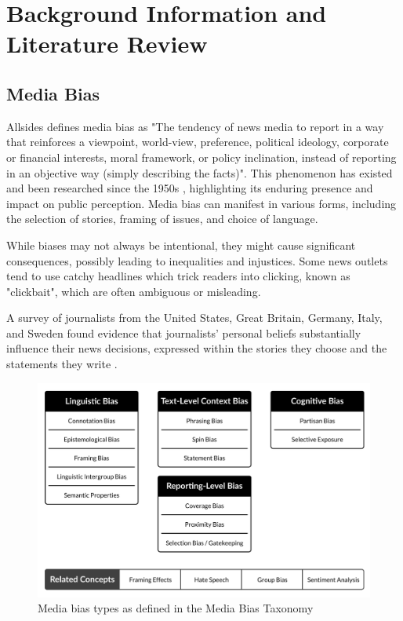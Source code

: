 \chapter{Background Information and Literature Review}
\label{cha:2}


\section{Media Bias}

Allsides \cite{allsides-2022-bias-definition} defines media bias as "The tendency of news media to report in a way that reinforces a viewpoint, world-view, preference, political ideology, corporate or financial interests, moral framework, or policy inclination, instead of reporting in an objective way (simply describing the facts)". This phenomenon has existed and been researched since the 1950s \cite{white-1950-case-study-selection-news}, highlighting its enduring presence and impact on public perception. Media bias can manifest in various forms, including the selection of stories, framing of issues, and choice of language.

While biases may not always be intentional, they might cause significant consequences, possibly leading to inequalities and injustices. Some news outlets tend to use catchy headlines which trick readers into clicking, known as "clickbait", which are often ambiguous or misleading.

A survey of journalists from the United States, Great Britain, Germany, Italy, and Sweden found evidence that journalists' personal beliefs substantially influence their news decisions, expressed within the stories they choose and the statements they write \cite{patterson-donsbach-1996-news-decisions}.

\begin{figure}[htbp]
    \centering
    \includegraphics[width=0.9\linewidth]{images/bias-types-taxonomy.png}
    \caption{Media bias types as defined in the Media Bias Taxonomy \cite{spinde-2024-taxonomy}}
    \label{fig:bias-types-taxonomy}
\end{figure}

